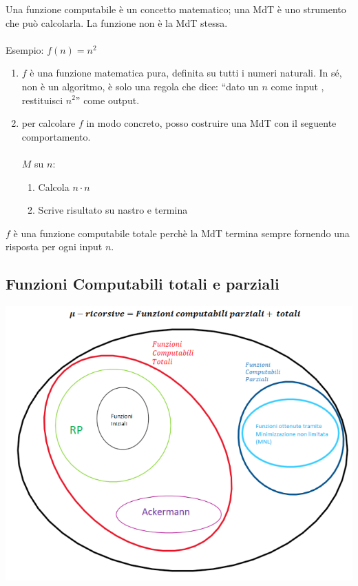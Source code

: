 \documentclass{article}  %
\theoremstyle{definition}
\begin{document}
\begin{osservazioni}
	\footnotesize %
	Una funzione computabile è un concetto matematico; una MdT è uno strumento che può calcolarla. La funzione non è la MdT stessa. \\ \\
	Esempio: $f(n)=n^2$
	\begin{enumerate}
		\item $f$ è una funzione matematica pura, definita su tutti i numeri naturali. In sé, non è un algoritmo, è solo una regola che dice: “dato un $n$ come input
		      , restituisci $n^2$” come output.
		\item per calcolare $f$ in modo concreto, posso costruire una MdT con il seguente comportamento. \\ \\ $M$ su $n$:
		      \begin{enumerate}
			      \item Calcola $n \cdot n$
			      \item Scrive risultato su nastro e termina
		      \end{enumerate}
	\end{enumerate}
	$f$ è una funzione computabile totale perchè la MdT termina sempre fornendo una risposta per ogni input $n$.
\end{osservazioni}


\subsection{Funzioni Computabili totali e parziali}
\begin{center}
	\includegraphics[width=0.9\linewidth]{funzioni-computabili.png}
\end{center}
\end{document}
